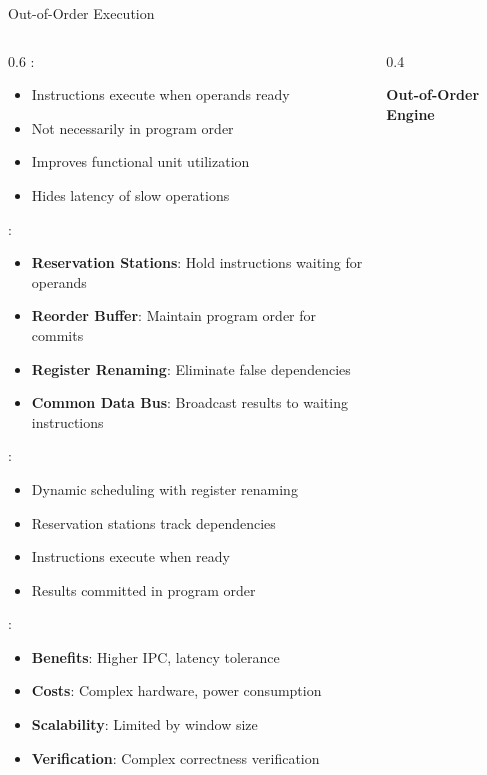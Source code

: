 \begin{frame}{Out-of-Order Execution}
\begin{columns}
\begin{column}{0.6\textwidth}
:
\begin{itemize}
\item Instructions execute when operands ready
\item Not necessarily in program order
\item Improves functional unit utilization
\item Hides latency of slow operations
\end{itemize}

\vspace{0.3cm}
:
\begin{itemize}
\item \textbf{Reservation Stations}: Hold instructions waiting for operands
\item \textbf{Reorder Buffer}: Maintain program order for commits
\item \textbf{Register Renaming}: Eliminate false dependencies
\item \textbf{Common Data Bus}: Broadcast results to waiting instructions
\end{itemize}

\vspace{0.3cm}
:
\begin{itemize}
\item Dynamic scheduling with register renaming
\item Reservation stations track dependencies
\item Instructions execute when ready
\item Results committed in program order
\end{itemize}

\vspace{0.3cm}
:
\begin{itemize}
\item \textbf{Benefits}: Higher IPC, latency tolerance
\item \textbf{Costs}: Complex hardware, power consumption
\item \textbf{Scalability}: Limited by window size
\item \textbf{Verification}: Complex correctness verification
\end{itemize}
\end{column}
\begin{column}{0.4\textwidth}
\begin{center}
\textbf{Out-of-Order Engine}
\vspace{0.3cm}


\end{center}
\end{column}
\end{columns}
\end{frame}
